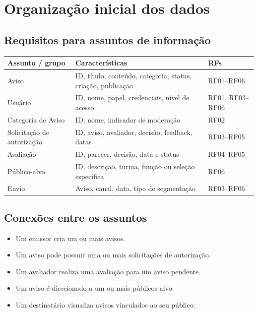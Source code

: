 \section{Organização inicial dos dados}
\subsection{Requisitos para assuntos de informação}
\begin{table}[!ht]\centering\small\renewcommand{\arraystretch}{1.45}
\begin{tabularx}{\linewidth}{|>{\raggedright\arraybackslash}X|>{\raggedright\arraybackslash}X|>{\centering\arraybackslash}p{2cm}|}
\hline
\textbf{Assunto / grupo} & \textbf{Características} & \textbf{RFs} \\
\hline
Aviso & ID, título, conteúdo, categoria, status, criação, publicação & RF01--RF06 \\
\hline
Usuário & ID, nome, papel, credenciais, nível de acesso & RF01, RF03--RF06 \\
\hline
Categoria de Aviso & ID, nome, indicador de moderação & RF02 \\
\hline
Solicitação de autorização & ID, aviso, avaliador, decisão, feedback, datas & RF03--RF05 \\
\hline
Avaliação & ID, parecer, decisão, data e status & RF04--RF05 \\
\hline
Público-alvo & ID, descrição, turma, função ou seleção específica & RF06 \\
\hline
Envio & Aviso, canal, data, tipo de segmentação & RF03--RF06 \\
\hline
\end{tabularx}
\end{table}

\subsection{Conexões entre os assuntos}
\begin{itemize}
\item Um emissor cria um ou mais avisos.
\item Um aviso pode possuir uma ou mais solicitações de autorização.
\item Um avaliador realiza uma avaliação para um aviso pendente.
\item Um aviso é direcionado a um ou mais públicos-alvo.
\item Um destinatário visualiza avisos vinculados ao seu público.
\end{itemize}

